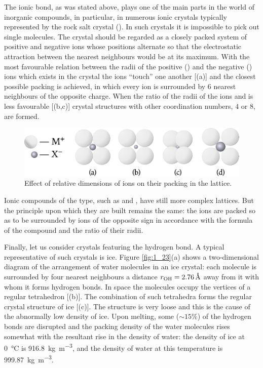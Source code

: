The ionic bond, as was stated above, plays one of the main parts in the world of inorganic compounds, in particular, in numerous ionic crystals typically represented by the rock salt crystal  (). In such crystals it is impossible to pick out single molecules. The crystal should be regarded as a closely packed system of positive and negative ions whose positions alternate so that the electrostatic attraction between the nearest neighbours would be at its maximum. With the most favourable relation between the radii of the positive () and the negative () ions which exists in the  crystal the ions ``touch'' one another [(a)] and the closest possible packing is achieved, in which every ion is surrounded by $6$ nearest neighbours of the opposite charge. When the ratio of the radii of the ions  and is less favourable [(b,c)] crystal structures with other coordination numbers, $4$ or $8$, are formed.

\begin{figure}[t]
	\begin{center}
		\includegraphics[scale=1.1]{figures/ch_01/fig_1_22.pdf}
		\caption[]{Effect of relative dimensions of ions on their packing in the lattice.}
		\label{fig:1_22}
	\end{center}
	\vspace{-0.7cm}
\end{figure}

Ionic compounds of the  type, such as  and , have still more complex lattices. But the principle upon which they are built remains the same: the ions are packed so as to be surrounded by ions of the opposite sign in accordance with the formula of the compound and the ratio of their radii.

Finally, let us consider crystals featuring the hydrogen bond. A typical representative of such crystals is ice. Figure \ref{fig:1_23}(a) shows a two-dimensional diagram of the arrangement of water molecules in an ice crystal: each molecule is surrounded by four nearest neighbours a distance $r_{\ce{OH}}=\SI{2.76}{\angstrom}$ away from it with whom it forms hydrogen bonds. In space the molecules occupy the vertices of a regular tetrahedron [(b)]. The combination of such tetrahedra forms the regular crystal structure of ice [(c)]. The structure is very loose and this is the cause of the abnormally low density of ice. Upon melting, some ($\sim 15\%$) of the hydrogen bonds are disrupted and the packing density of the water molecules rises somewhat with the resultant rise in the density of water: the density of ice at \SI{0}{\degreeCelsius} is \SI{916.8}{\kilo\gram\per\metre\cubed}, and the density of water at this temperature is \SI{999.87}{\kilo\gram\per\metre\cubed}.

